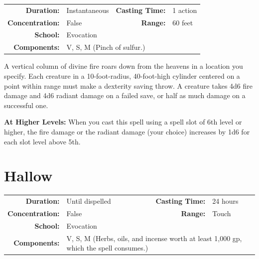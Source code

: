 \documentclass[12pt,showtrims]{memoir}
\begin{document}
{
\small\centering\vspace{-6pt}
\begin{tabular}{rlrl}
\toprule

\textbf{Duration:} & Instantaneous &
\textbf{Casting Time:} & 1 action \\
\textbf{Concentration:} & False &
\textbf{Range:} & 60 feet \\
\textbf{School:} & Evocation \\
\textbf{Components:} & \multicolumn{3}{p{0.7\textwidth}}{V, S, M (Pinch of sulfur.)}\\

\bottomrule
\end{tabular}
}

\vspace{1\baselineskip}\noindent A vertical column of divine fire roars down from the heavens in a location you specify. Each creature in a 10-foot-radius, 40-foot-high cylinder centered on a point within range must make a dexterity saving throw. A creature takes 4d6 fire damage and 4d6 radiant damage on a failed save, or half as much damage on a successful one.

\vspace{8pt} \noindent\textbf{At Higher Levels:} When you cast this spell using a spell slot of 6th level or higher, the fire damage or the radiant damage (your choice) increases by 1d6 for each slot level above 5th.
\newpage
\section*{Hallow}

{
\small\centering\vspace{-6pt}
\begin{tabular}{rlrl}
\toprule

\textbf{Duration:} & Until dispelled &
\textbf{Casting Time:} & 24 hours \\
\textbf{Concentration:} & False &
\textbf{Range:} & Touch \\
\textbf{School:} & Evocation \\
\textbf{Components:} & \multicolumn{3}{p{0.7\textwidth}}{V, S, M (Herbs, oils, and incense worth at least 1,000 gp, which the spell consumes.)}\\

\bottomrule
\end{tabular}
}
\end{document}
